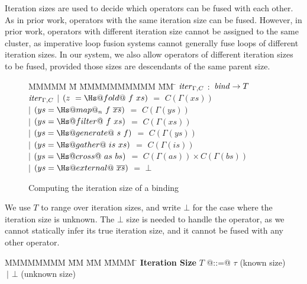 Iteration sizes are used to decide which operators can be fused with each other.
As in prior work, operators with the same iteration size can be fused.
However, in prior work, operators with different iteration size cannot be assigned to the same cluster, as imperative loop fusion systems cannot generally fuse loops of different iteration sizes.
In our system, we also allow operators of different iteration sizes to be fused, provided those sizes are descendants of the same parent size.

\begin{figure}
\begin{tabbing}
MMMMM \= M \= MMMMMMMMMM \= MM \= \kill
$\mathit{iter}_{\Gamma,C}$  
        \>$:$\> $\mathit{bind} \rightarrow T$ 
\\[1ex]
$\mathit{iter}_{\Gamma,C}$
        \> $|$  \> $(z~ = \Hs@fold@~ f~xs)$     
                \> $=$ \> $C(\Gamma(xs))$ 
\\
        \> $|$  \> $(ys = \Hs@map@_n~f~\overline{xs})$
                \> $=$ \> $C(\Gamma(ys))$ 
\\
        \> $|$  \> $(ys = \Hs@filter@~f~xs)$    
                \> $=$ \> $C(\Gamma(xs))$ 
\\
        \> $|$  \> $(ys = \Hs@generate@~s~f)$  
                \> $=$ \> $C(\Gamma(ys))$ 
\\
        \> $|$  \> $(ys = \Hs@gather@~is~xs)$    
                \> $=$ \> $C(\Gamma(is))$ 
\\
        \> $|$  \> $(ys = \Hs@cross@~as~bs)$     
                \> $=$ \> $C(\Gamma(as)) \times C(\Gamma(bs))$ 
\\
        \> $|$  \> $(ys = \Hs@external@~\overline{xs})$  
                \> $=$ \> $\bot$ 
\end{tabbing}
\caption{Computing the iteration size of a binding}
\label{fig:clustering:iter}
\end{figure}


We use $T$ to range over iteration sizes, and write $\bot$ for the case where the iteration size is unknown. The $\bot$ size is needed to handle the \Hs@external@ operator, as we cannot statically infer its true iteration size, and it cannot be fused with any other operator.

\begin{tabbing}
MMMMMMMM \= MM       \= MM \= MMMM \= \kill
\textbf{Iteration Size}
 \> $T$         \> @::=@  \> $\tau$        \> (known size) \\
 \>             \> $~|$   \> $\bot$     \> (unknown size) \\
\end{tabbing}

